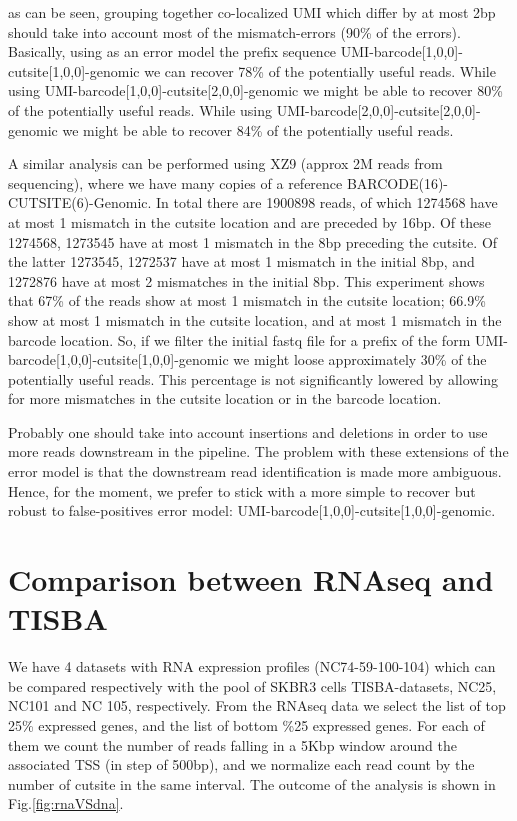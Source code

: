 \documentclass[11pt,a4paper]{article}
\begin{document}
as can be seen, grouping together co-localized UMI which differ by at most 2bp 
should take into account most of the mismatch-errors (90\% of the errors). 
Basically, using as an error model the prefix sequence UMI-barcode[1,0,0]-cutsite[1,0,0]-genomic we can recover 78\% of the potentially useful reads. While using UMI-barcode[1,0,0]-cutsite[2,0,0]-genomic we might be able to recover 80\% of the potentially useful reads. While using UMI-barcode[2,0,0]-cutsite[2,0,0]-genomic we might be able to recover 84\% of the potentially useful reads.

A similar analysis can be performed using XZ9 (approx 2M reads from sequencing), where we have many copies of a 
reference BARCODE(16)-CUTSITE(6)-Genomic. In total there are 1900898 reads, 
of which 1274568 have at most 1 mismatch in the cutsite location and are preceded by 16bp. Of these 1274568, 1273545 have at most 1 mismatch in the 8bp 
preceding the cutsite. Of the latter 1273545, 1272537 have at most 1 mismatch 
in the initial 8bp, and 1272876 have at most 2 mismatches in the initial 8bp. This experiment shows that 67\% of the reads show at most 1 mismatch in the cutsite location; 66.9\% show at most 1 mismatch in the cutsite location, and at most 1 mismatch in the barcode location. So, if we filter the initial fastq file for a prefix of the form UMI-barcode[1,0,0]-cutsite[1,0,0]-genomic we might loose approximately 30\% of the potentially useful reads. This percentage 
is not significantly lowered by allowing for more mismatches in the cutsite location or in the barcode location. 

Probably one should take into account insertions and deletions in order to use more reads downstream in the pipeline. The problem with these extensions of the error model is that the downstream read identification is made more ambiguous. Hence, for the moment, we prefer to stick with a more simple to recover but robust to false-positives error model: UMI-barcode[1,0,0]-cutsite[1,0,0]-genomic.

\section{Comparison between RNAseq and TISBA}
We have 4 datasets with RNA expression profiles (NC74-59-100-104) which 
can be compared respectively with the pool of SKBR3 cells TISBA-datasets, NC25, NC101 and NC 105, respectively. From the RNAseq data we select the list of top 25\% expressed genes, and the list of bottom \%25 expressed genes. For each of them we count the number of reads falling in a 5Kbp window around the associated TSS (in step of 500bp), and we normalize each read count by the number of cutsite in the same interval. The outcome of the analysis is shown in 
Fig.\ref{fig:rnaVSdna}.
\end{document}
